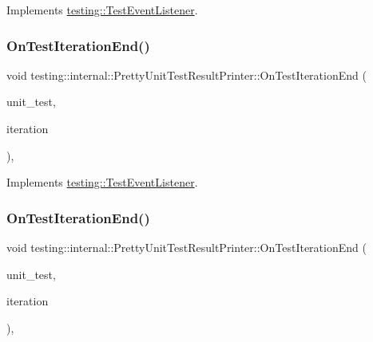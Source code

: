 Implements \mbox{\hyperlink{classtesting_1_1_test_event_listener_a550fdb3e55726e4cefa09f5697941425}{testing\+::\+Test\+Event\+Listener}}.

\mbox{\label{classtesting_1_1internal_1_1_pretty_unit_test_result_printer_a447fc02d3e3af17cef6f0727bab7414a}} 
\subsubsection{\texorpdfstring{OnTestIterationEnd()}{OnTestIterationEnd()}\hspace{0.1cm}{\footnotesize\ttfamily [2/3]}}
{\footnotesize\ttfamily void testing\+::internal\+::\+Pretty\+Unit\+Test\+Result\+Printer\+::\+On\+Test\+Iteration\+End (\begin{DoxyParamCaption}\item[{const \mbox{\hyperlink{classtesting_1_1_unit_test}{Unit\+Test}} \&}]{unit\+\_\+test,  }\item[{int}]{iteration }\end{DoxyParamCaption})\hspace{0.3cm}{\ttfamily [override]}, {\ttfamily [virtual]}}



Implements \mbox{\hyperlink{classtesting_1_1_test_event_listener_a550fdb3e55726e4cefa09f5697941425}{testing\+::\+Test\+Event\+Listener}}.

\mbox{\label{classtesting_1_1internal_1_1_pretty_unit_test_result_printer_a447fc02d3e3af17cef6f0727bab7414a}} 
\subsubsection{\texorpdfstring{OnTestIterationEnd()}{OnTestIterationEnd()}\hspace{0.1cm}{\footnotesize\ttfamily [3/3]}}
{\footnotesize\ttfamily void testing\+::internal\+::\+Pretty\+Unit\+Test\+Result\+Printer\+::\+On\+Test\+Iteration\+End (\begin{DoxyParamCaption}\item[{const \mbox{\hyperlink{classtesting_1_1_unit_test}{Unit\+Test}} \&}]{unit\+\_\+test,  }\item[{int}]{iteration }\end{DoxyParamCaption})\hspace{0.3cm}{\ttfamily [override]}, {\ttfamily [virtual]}}



